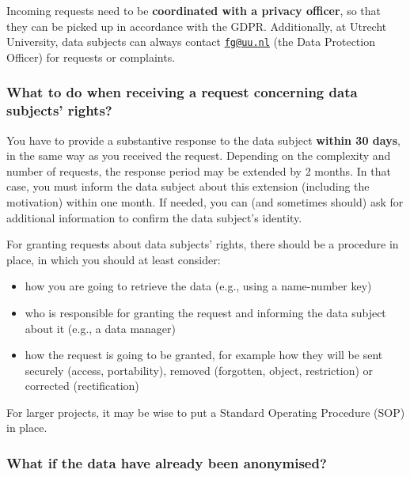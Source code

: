 \documentclass[
]{book}
\providecommand{\tightlist}{%
  \setlength{\itemsep}{0pt}\setlength{\parskip}{0pt}}
\begin{document}
Incoming requests need to be \textbf{coordinated with a privacy officer}, so that
they can be picked up in accordance with the GDPR. Additionally, at Utrecht
University, data subjects can always contact
\href{mailto:fg@uu.nl}{\nolinkurl{fg@uu.nl}} (the Data Protection Officer) for
requests or complaints.

\hypertarget{what-to-do-when-receiving-a-request-concerning-data-subjects-rights}{%
\subsubsection{What to do when receiving a request concerning data subjects' rights?}\label{what-to-do-when-receiving-a-request-concerning-data-subjects-rights}}

You have to provide a substantive response to the data subject \textbf{within 30 days},
in the same way as you received the request. Depending on the complexity and
number of requests, the response period may be extended by 2 months. In that
case, you must inform the data subject about this extension (including the
motivation) within one month. If needed, you can (and sometimes should) ask for
additional information to confirm the data subject's identity.

For granting requests about data subjects' rights, there should be a procedure
in place, in which you should at least consider:

\begin{itemize}
\tightlist
\item
  how you are going to retrieve the data (e.g., using a name-number key)
\item
  who is responsible for granting the request and informing the data subject
  about it (e.g., a data manager)
\item
  how the request is going to be granted, for example how they will be sent
  securely (access, portability), removed (forgotten, object, restriction) or
  corrected (rectification)
\end{itemize}

For larger projects, it may be wise to put a Standard Operating Procedure (SOP)
in place.

\hypertarget{what-if-the-data-have-already-been-anonymised}{%
\subsubsection{What if the data have already been anonymised?}\label{what-if-the-data-have-already-been-anonymised}}
\end{document}
